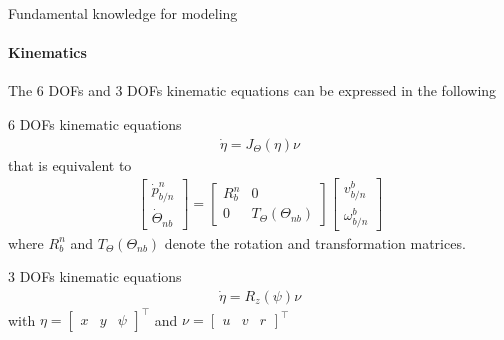 \begin{frame}{Fundamental knowledge for modeling}
	\framesubtitle{Kinematics}
	The 6 DOFs and 3 DOFs kinematic equations can be expressed in the following
	\begin{block}{6 DOFs kinematic equations}
		\begin{align}
			\dot{\eta} = J_{\Theta}(\eta)\nu
		\end{align}
		that is equivalent to
		\begin{align}
			\begin{bmatrix}
				\dot{p}_{b/n}^n \\ \dot{\Theta}_{nb}
			\end{bmatrix} = \begin{bmatrix}
				R_b^n & 0 \\
				0 & T_{\Theta}(\Theta_{nb})
			\end{bmatrix}\begin{bmatrix}
				v_{b/n}^b \\ \omega_{b/n}^b
			\end{bmatrix}
		\end{align}
		where $R_b^n$ and $T_{\Theta}(\Theta_{nb})$ denote the rotation and transformation matrices.
	\end{block}
	
	\begin{block}{3 DOFs kinematic equations}
		\begin{align}
			\dot{\eta} = R_z(\psi)\nu
		\end{align}
		with $\eta = \begin{bmatrix}
			x & y & \psi
		\end{bmatrix}^\top$ and $\nu = \begin{bmatrix}
			u & v & r
		\end{bmatrix}^\top$
	\end{block}
\end{frame}





